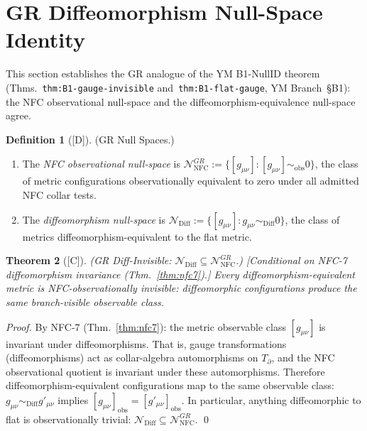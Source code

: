 \documentclass[12pt,oneside]{amsbook}
\theoremstyle{plain}
\newtheorem{theorem}{Theorem}[section]
\theoremstyle{definition}
\newtheorem{definition}[theorem]{Definition}
\theoremstyle{remark}
\newcommand{\status}[1]{\textup{[#1]}}
\begin{document}
\section{GR Diffeomorphism Null-Space Identity}
\label{sec:gr-nullid}

This section establishes the GR analogue of the YM B1-NullID theorem
(Thms.~\texttt{thm:B1-gauge-invisible} and~\texttt{thm:B1-flat-gauge},
YM Branch~§B1): the NFC observational null-space and the
diffeomorphism-equivalence null-space agree.

\begin{definition}[\status{D}]\label{def:gr-null-spaces}
\textup{(GR Null Spaces.)}
\begin{enumerate}[label=\textup{(\arabic*)}]
 \item The \emph{NFC observational null-space} is
 $\mathcal{N}_{\mathrm{NFC}}^{GR} := \{[g_{\mu\nu}] :
 [g_{\mu\nu}] \sim_{\mathrm{obs}} 0\}$, the class of metric
 configurations observationally equivalent to zero under all
 admitted NFC collar tests.
 \item The \emph{diffeomorphism null-space} is
 $\mathcal{N}_{\mathrm{Diff}} := \{[g_{\mu\nu}] :
 g_{\mu\nu} \sim_{\mathrm{Diff}} 0\}$, the class of metrics
 diffeomorphism-equivalent to the flat metric.
\end{enumerate}
\end{definition}

\begin{theorem}[\status{C}]\label{thm:gr-diff-invisible}
\textup{(GR Diff-Invisible: $\mathcal{N}_{\mathrm{Diff}} \subseteq
\mathcal{N}_{\mathrm{NFC}}^{GR}$.)}
\textup{[Conditional on NFC-7 diffeomorphism invariance
(Thm.~\ref{thm:nfc7}).]}
Every diffeomorphism-equivalent metric is NFC-observationally
invisible: diffeomorphic configurations produce the same
branch-visible observable class.
\end{theorem}

\begin{proof}
By NFC-7 (Thm.~\ref{thm:nfc7}): the metric observable class
$[g_{\mu\nu}]$ is invariant under diffeomorphisms. That is,
gauge transformations (diffeomorphisms) act as collar-algebra
automorphisms on $T_\partial$, and the NFC observational quotient
is invariant under these automorphisms. Therefore
diffeomorphism-equivalent configurations map to the same
observable class: $g_{\mu\nu} \sim_{\mathrm{Diff}} g'_{\mu\nu}$
implies $[g_{\mu\nu}]_{\mathrm{obs}} = [g'_{\mu\nu}]_{\mathrm{obs}}$.
In particular, anything diffeomorphic to flat is
observationally trivial: $\mathcal{N}_{\mathrm{Diff}} \subseteq
\mathcal{N}_{\mathrm{NFC}}^{GR}$.
\qed
\end{proof}
\end{document}
